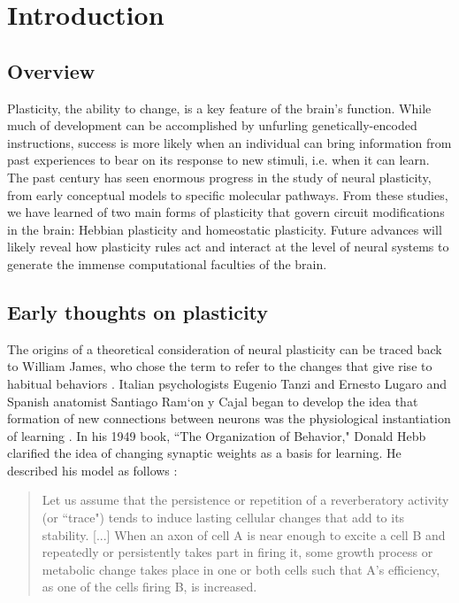 \chapter{Introduction}

\section{Overview}

Plasticity, the ability to change, is a key feature of the brain's function. While much of development can be accomplished by unfurling genetically-encoded instructions, success is more likely when an individual can bring information from past experiences to bear on its response to new stimuli, i.e. when it can learn. The past century has seen enormous progress in the study of neural plasticity, from early conceptual models to specific molecular pathways. From these studies, we have learned of two main forms of plasticity that govern circuit modifications in the brain: Hebbian plasticity and homeostatic plasticity. Future advances will likely reveal how plasticity rules act and interact at the level of neural systems to generate the immense computational faculties of the brain.

\section{Early thoughts on plasticity}
The origins of a theoretical consideration of neural plasticity can be traced back to William James, who chose the term to refer to the changes that give rise to habitual behaviors \cite{James1910, Berlucchi2009}. Italian psychologists Eugenio Tanzi and Ernesto Lugaro and Spanish anatomist Santiago Ram\a`on y Cajal began to develop the idea that formation of new connections between neurons was the physiological instantiation of learning \cite{Berlucchi2009}. In his 1949 book, ``The Organization of Behavior," Donald Hebb clarified the idea of changing synaptic weights as a basis for learning. He described his model as follows \cite{Hebb1949}:

\begin{quotation}
Let us assume that the persistence or repetition of a reverberatory activity (or ``trace") tends to induce lasting cellular changes that add to its stability. [...] When an axon of cell A is near enough to excite a cell B and repeatedly or persistently takes part in firing it, some growth process or metabolic change takes place in one or both cells such that A's efficiency, as one of the cells firing B, is increased.
\end{quotation}

